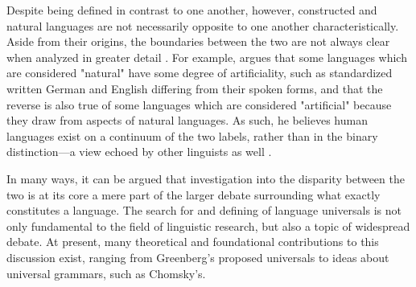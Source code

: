 \documentclass[12pt,a4paper]{article}
\numberwithin{figure}{section}
\numberwithin{table}{section}
\numberwithin{definition}{section}
\begin{document}
Despite being defined in contrast to one another, however, constructed and natural languages are not necessarily opposite to one another characteristically. Aside from their origins, the boundaries between the two are not always clear when analyzed in greater detail \parencite{goodall2022article}. For example, \textcite{Schubert1989inbook} argues that some languages which are considered "natural" have some degree of artificiality, such as standardized written German and English differing from their spoken forms, and that the reverse is also true of some languages which are considered "artificial" because they draw from aspects of natural languages. As such, he believes human languages exist on a continuum of the two labels, rather than in the binary distinction---a view echoed by other linguists as well \parencite{Novikov2022article}. 


In many ways, it can be argued that investigation into the disparity between the two is at its core a mere part of the larger debate surrounding what exactly constitutes a language. The search for and defining of language universals is not only fundamental to the field of linguistic research, but also a topic of widespread debate. At present, many theoretical and foundational contributions to this discussion exist, ranging from Greenberg's proposed universals \parencite{Greenberg1970book} to ideas about universal grammars, such as Chomsky's. 

\end{document}
